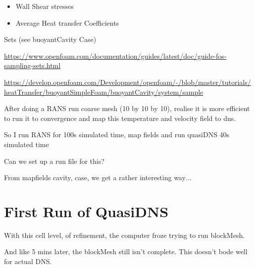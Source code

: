 \documentclass[12pt]{article}
\renewcommand{\_}{\kern-1.5pt\textunderscore\kern-1.5pt}
\begin{document}
\begin{itemize}
	\item Wall Shear stresses\par

	\item Average Heat transfer Coefficients \par


\end{itemize}
Sets (see buoyantCavity Case)\par

\href{https://www.openfoam.com/documentation/guides/latest/doc/guide-fos-sampling-sets.html}{https://www.openfoam.com/documentation/guides/latest/doc/guide-fos-sampling-sets.html}\par

\href{https://develop.openfoam.com/Development/openfoam/-/blob/master/tutorials/heatTransfer/buoyantSimpleFoam/buoyantCavity/system/sample}{https://develop.openfoam.com/Development/openfoam/-/blob/master/tutorials/heatTransfer/buoyantSimpleFoam/buoyantCavity/system/sample}\par


\vspace{\baselineskip}
After doing a RANS run coarse mesh (10 by 10 by 10), realise it is more efficient to run it to convergence and map this temperature and velocity field to dns.\par

So I run RANS for 100s simulated time, map fields and run quasiDNS 40s simulated time\par

Can we set up a run file for this?\par

From mapfields cavity, case, we get a rather interesting way$ \ldots $ \par

\par

\section{First Run of QuasiDNS}\par

With this cell level, of refinement, the computer froze trying to run blockMesh.\par

And like 5 mins later, the blockMesh still isn’t complete. This doesn’t bode well for actual DNS.\par
\end{document}
